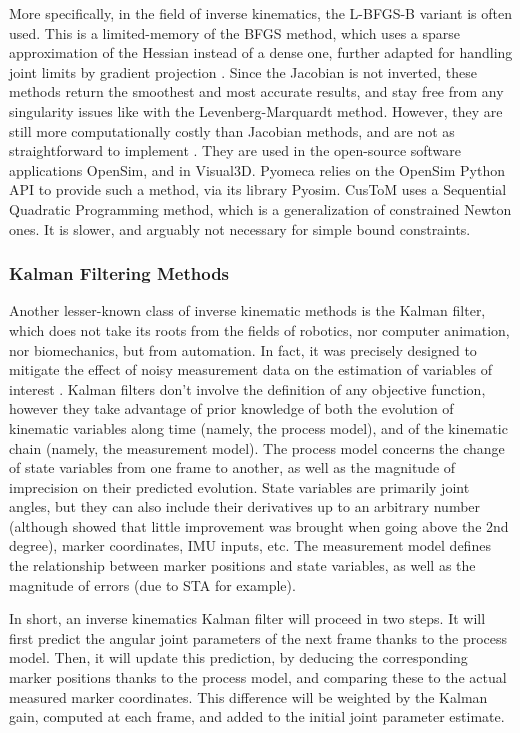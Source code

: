More specifically, in the field of inverse kinematics, the L-BFGS-B variant is often used. This is a limited-memory of the BFGS method, which uses a sparse approximation of the Hessian instead of a dense one, further adapted for handling joint limits by gradient projection \cite{Byrd1995,Zhao1994}. Since the Jacobian is not inverted, these methods return the smoothest and most accurate results, and stay free from any singularity issues like with the Levenberg-Marquardt method. However, they are still more computationally costly than Jacobian methods, and are not as straightforward to implement \cite{Aristidou2018}. They are used in the open-source software applications OpenSim, and in Visual3D. Pyomeca \cite{Martinez2020} relies on the OpenSim Python API to provide such a method, via its library Pyosim. CusToM uses a Sequential Quadratic Programming method, which is a generalization of constrained Newton ones. It is slower, and arguably not necessary for simple bound constraints.


\newpage
\subsubsection{Kalman Filtering Methods}

Another lesser-known class of inverse kinematic methods is the Kalman filter, which does not take its roots from the fields of robotics, nor computer animation, nor biomechanics, but from automation. In fact, it was precisely designed to mitigate the effect of noisy measurement data on the estimation of variables of interest \cite{Kalman1960}. Kalman filters don't involve the definition of any objective function, however they take advantage of prior knowledge of both the evolution of kinematic variables along time (namely, the process model), and of the kinematic chain (namely, the measurement model). The process model concerns the change of state variables from one frame to another, as well as the magnitude of imprecision on their predicted evolution. State variables are primarily joint angles, but they can also include their derivatives up to an arbitrary number (although \cite{DeGroote2008} showed that little improvement was brought when going above the 2nd degree), marker coordinates, IMU inputs, etc. The measurement model defines the relationship between marker positions and state variables, as well as the magnitude of errors (due to STA for example). 

In short, an inverse kinematics Kalman filter will proceed in two steps. It will first predict the angular joint parameters of the next frame thanks to the process model. Then, it will update this prediction, by deducing the corresponding marker positions thanks to the process model, and comparing these to the actual measured marker coordinates. This difference will be weighted by the Kalman gain, computed at each frame, and added to the initial joint parameter estimate. 


